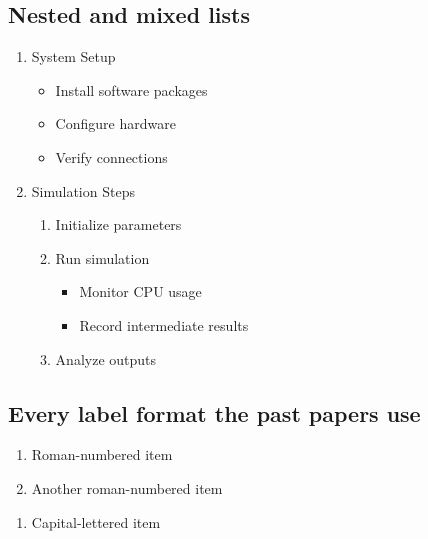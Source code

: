 \documentclass[11pt,a4paper]{article}
\theoremstyle{definition}                   %
\begin{document}
\subsection{Nested and mixed lists}

\begin{enumerate}[label=\arabic*.]
    \item System Setup
    \begin{itemize}
        \item Install software packages
        \item Configure hardware
        \item[!] Verify connections      %
    \end{itemize}

    \item Simulation Steps
    \begin{enumerate}[label=(\alph*)]
        \item Initialize parameters
        \item Run simulation
        \begin{itemize}[label=-]         %
            \item Monitor CPU usage
            \item[$\rightarrow$] Record intermediate results
        \end{itemize}
        \item Analyze outputs
    \end{enumerate}
\end{enumerate}

\subsection{Every label format the past papers use}

\begin{enumerate}[label={(\Roman*)}]      %
    \item Roman-numbered item
    \item Another roman-numbered item
\end{enumerate}

\begin{enumerate}[label=(\Alph*)]          %
    \item Capital-lettered item
\end{enumerate}
\end{document}
